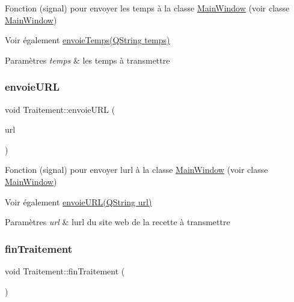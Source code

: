 Fonction (signal) pour envoyer les temps à la classe \hyperlink{classMainWindow}{Main\+Window} (voir classe \hyperlink{classMainWindow}{Main\+Window}) 

\begin{DoxySeeAlso}{Voir également}
\hyperlink{classTraitement_ab8dfd067d627e71a4abb42aaf7874115}{envoie\+Temps(\+Q\+String temps)} 
\end{DoxySeeAlso}

\begin{DoxyParams}{Paramètres}
{\em temps} & les temps à transmettre \\
\hline
\end{DoxyParams}
\mbox{\label{classTraitement_ab4ed4bad3ea04585617fbc8cd758193a}} 
\subsubsection{\texorpdfstring{envoie\+U\+RL}{envoieURL}}
{\footnotesize\ttfamily void Traitement\+::envoie\+U\+RL (\begin{DoxyParamCaption}\item[{Q\+String}]{url }\end{DoxyParamCaption})\hspace{0.3cm}{\ttfamily [signal]}}



Fonction (signal) pour envoyer l\textquotesingle{}url à la classe \hyperlink{classMainWindow}{Main\+Window} (voir classe \hyperlink{classMainWindow}{Main\+Window}) 

\begin{DoxySeeAlso}{Voir également}
\hyperlink{classTraitement_ab4ed4bad3ea04585617fbc8cd758193a}{envoie\+U\+R\+L(\+Q\+String url)} 
\end{DoxySeeAlso}

\begin{DoxyParams}{Paramètres}
{\em url} & l\textquotesingle{}url du site web de la recette à transmettre \\
\hline
\end{DoxyParams}
\mbox{\label{classTraitement_a83495c6e878e66511b8af67ee369a012}} 
\subsubsection{\texorpdfstring{fin\+Traitement}{finTraitement}}
{\footnotesize\ttfamily void Traitement\+::fin\+Traitement (\begin{DoxyParamCaption}{ }\end{DoxyParamCaption})\hspace{0.3cm}{\ttfamily [signal]}}



